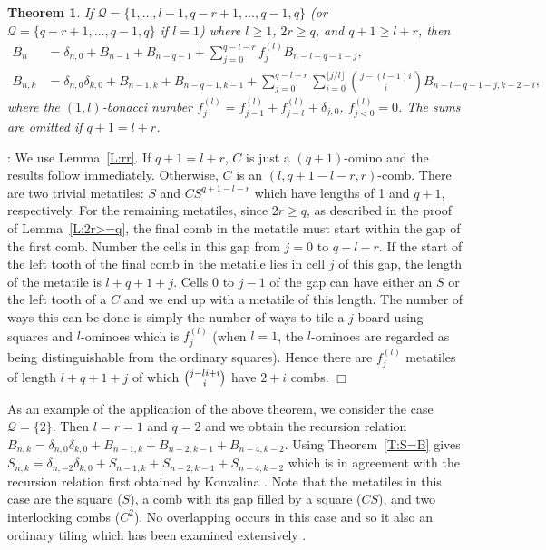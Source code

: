 \documentclass[preprint,3p]{elsarticle}
\newtheorem{thm}{Theorem}
\newcommand{\floor}[1]{\lfloor#1\rfloor}
\newenvironment{proof}[1][]%
{\noindent\textit{\ifthenelse{\equal{#1}{}}{Proof}{Proof #1}}: }%
{\leavevmode\unskip\nobreak\quad\hspace*{\fill}$\Box$\par}
\begin{document}
\begin{thm}\label{T:2r>=q}
If $\mathcal{Q}=\{1,\ldots,l-1,q-r+1,\ldots,q-1,q\}$ (or
$\mathcal{Q}=\{q-r+1,\ldots,q-1,q\}$ if $l=1$) where $l\geq1$, $2r\geq
q$, and $q+1\geq l+r$, then
\begin{align*} 
B_n&=\delta_{n,0}+B_{n-1}+B_{n-q-1}+\sum_{j=0}^{q-l-r}f^{(l)}_jB_{n-l-q-1-j},\\
B_{n,k}&=\delta_{n,0}\delta_{k,0}+B_{n-1,k}+B_{n-q-1,k-1}
+\sum_{j=0}^{q-l-r}\sum_{i=0}^{\floor{j/l}}\binom{j-(l-1)i}{i}B_{n-l-q-1-j,k-2-i},
\end{align*} 
where the $(1,l)$-bonacci number
$f^{(l)}_j=f^{(l)}_{j-1}+f^{(l)}_{j-l}+\delta_{j,0}$, $f^{(l)}_{j<0}=0$. 
The sums are omitted if $q+1=l+r$.
\end{thm}
\begin{proof} 
We use Lemma~\ref{L:rr}.  If $q+1=l+r$, $C$ is just a $(q+1)$-omino
and the results follow immediately. Otherwise, $C$ is an
$(l,q+1-l-r,r)$-comb. There are two trivial metatiles: $S$ and
$CS^{q+1-l-r}$ which have lengths of 1 and $q+1$, respectively. For
the remaining metatiles, since $2r\geq q$, as described in the proof
of Lemma~\ref{L:2r>=q}, the final comb in the metatile must start
within the gap of the first comb.  Number the cells in this gap from
$j=0$ to $q-l-r$. If the start of the left tooth of the final
comb in the metatile lies in cell $j$ of this gap, the length of the
metatile is $l+q+1+j$. Cells 0 to $j-1$ of the gap can have either an
$S$ or the left tooth of a $C$ and we end up with a metatile of this
length. The number of ways this can be done is simply the number of
ways to tile a $j$-board using squares and $l$-ominoes which is
$f^{(l)}_j$ \cite{BQ=03} (when $l=1$, the $l$-ominoes are regarded as
being distinguishable from the ordinary squares).  Hence there are
$f^{(l)}_j$ metatiles of length $l+q+1+j$ of which
$\tbinom{j-li+i}{i}$ have $2+i$ combs.
\end{proof}

As an example of the application of the above theorem, we consider the
case $\mathcal{Q}=\{2\}$. Then $l=r=1$ and $q=2$ and we obtain the
recursion relation
$B_{n,k}=\delta_{n,0}\delta_{k,0}+B_{n-1,k}+B_{n-2,k-1}+B_{n-4,k-2}$.
Using Theorem~\ref{T:S=B} gives 
$S_{n,k}=\delta_{n,-2}\delta_{k,0}+S_{n-1,k}+S_{n-2,k-1}+S_{n-4,k-2}$
which is in agreement with the recursion relation first obtained by Konvalina
\cite{Kon81}. Note that the metatiles in this case are the
square ($S$), a comb with its gap filled by a square ($CS$),
and two interlocking combs ($C^2$). No overlapping occurs in this case
and so it also an ordinary tiling which has been examined extensively
\cite{EA21}.
\end{document}
